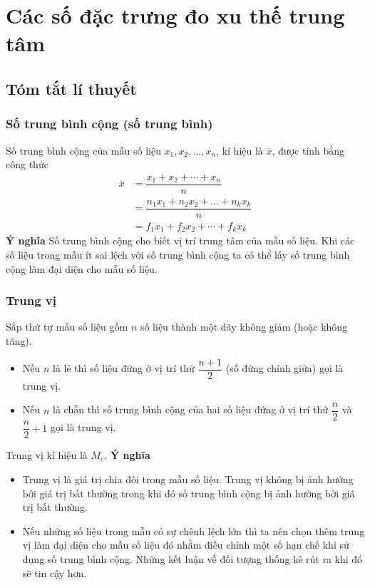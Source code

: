 \setcounter{bt}{0}
\setcounter{vd}{0}
\setcounter{section}{1}
\section{Các số đặc trưng đo xu thế trung tâm}
\subsection{Tóm tắt lí thuyết}
\subsubsection{Số trung bình cộng (số trung bình)}
	Số trung bình cộng của mẫu số liệu $x_1,x_2,\ldots,x_n$, kí hiệu là $\overline{x}$, được tính bằng công thức
	\begin{align*}
	\overline{x} & =\dfrac{x_1+x_2+\cdots +x_n}{n}\\
	& =\dfrac{n_1x_1 + n_2x_2 + \ldots + n_kx_k}{n}\\
	& =f_1x_1+f_2x_2+\cdots +f_kx_k		
	\end{align*}
\textbf{Ý nghĩa}
Số trung bình cộng cho biết vị trí trung tâm của mẫu số liệu. Khi các số liệu trong mẫu ít sai lệch với số trung bình cộng ta có thể lấy số trung bình cộng làm đại diện cho mẫu số liệu.

\subsubsection{Trung vị}
    Sắp thứ tự mẫu số liệu gồm $n$ số liệu thành một dãy không giảm (hoặc không tăng).
    \begin{itemize}
        \item Nếu $n$ là lẻ thì số liệu đứng ở vị trí thứ $\dfrac{n+1}{2}$ (số đứng chính giữa) gọi là trung vị.
        \item Nếu $n$ là chẵn thì số trung bình cộng của hai số liệu đứng ở vị trí thứ $\dfrac{n}{2}$ và $\dfrac{n}{2}+1$ gọi là trung vị.
    \end{itemize}
    Trung vị kí hiệu là $M_e$.
\textbf{Ý nghĩa}
\begin{itemize}
    \item Trung vị là giá trị chia đôi trong mẫu số liệu. Trung vị không bị ảnh hưởng bởi giá trị bất thường trong khi đó số trung bình cộng bị ảnh hưởng bởi giá trị bất thường.
    \item Nếu những số liệu trong mẫu có sự chênh lệch lớn thì ta nên chọn thêm trung vị làm đại diện cho mẫu số liệu đó nhằm điều chỉnh một số hạn chế khi sử dụng số trung bình cộng. Những kết luận về đối tượng thống kê rút ra khi đó sẽ tin cậy hơn.
\end{itemize}

